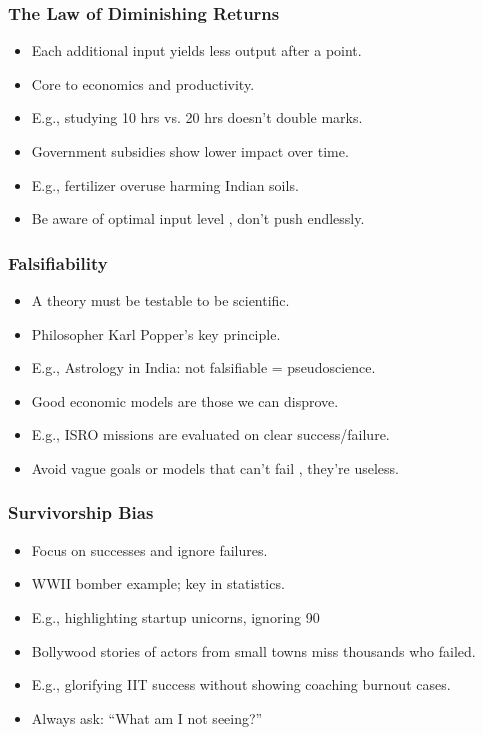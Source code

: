 \begin{frame}[fragile]\frametitle{The Law of Diminishing Returns}
  \begin{itemize}
    \item Each additional input yields less output after a point.
    \item Core to economics and productivity.
    \item E.g., studying 10 hrs vs. 20 hrs doesn't double marks.
    \item Government subsidies show lower impact over time.
    \item E.g., fertilizer overuse harming Indian soils.
    \item Be aware of optimal input level , don't push endlessly.
  \end{itemize}
\end{frame}

\begin{frame}[fragile]\frametitle{Falsifiability}
  \begin{itemize}
    \item A theory must be testable to be scientific.
    \item Philosopher Karl Popper's key principle.
    \item E.g., Astrology in India: not falsifiable = pseudoscience.
    \item Good economic models are those we can disprove.
    \item E.g., ISRO missions are evaluated on clear success/failure.
    \item Avoid vague goals or models that can't fail , they're useless.
  \end{itemize}
\end{frame}

\begin{frame}[fragile]\frametitle{Survivorship Bias}
  \begin{itemize}
    \item Focus on successes and ignore failures.
    \item WWII bomber example; key in statistics.
    \item E.g., highlighting startup unicorns, ignoring 90%
    \item Bollywood stories of actors from small towns miss thousands who failed.
    \item E.g., glorifying IIT success without showing coaching burnout cases.
    \item Always ask: ``What am I not seeing?''
  \end{itemize}
\end{frame}

